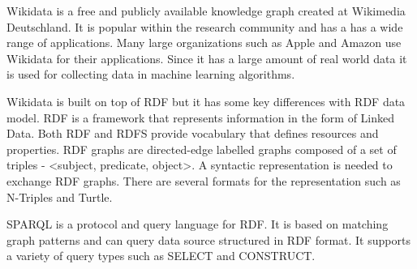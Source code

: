 \documentclass[12 pt, a4paper]{report}
\theoremstyle{definition}
\newcommand{\anas}[1]{\todo[color=red,inline]{#1}}
\begin{document}
Wikidata is a free and publicly available knowledge graph created at Wikimedia Deutschland. It is popular within the research community and has a has a wide range of applications. Many large organizations such as Apple and Amazon use Wikidata for their applications. Since it has a large amount of real world data it is used for collecting data in machine learning algorithms.

Wikidata is built on top of RDF but it has some key differences with RDF data model. RDF is a framework that represents information in the form of Linked Data. Both RDF and RDFS provide vocabulary that defines resources and properties. RDF graphs are directed-edge labelled graphs composed of a set of triples - <subject, predicate, object>. A syntactic representation is needed to exchange RDF graphs. There are several formats for the representation such as N-Triples and Turtle.

SPARQL is a protocol and query language for RDF. It is based on matching graph patterns and can query data source structured in RDF format. It supports a variety of query types such as SELECT and CONSTRUCT. 


\anas{complete this}



\tableofcontents
\newpage
\listoffigures
\newpage
\listoftables
\newpage
\lstlistoflistings
\newpage
\pagebreak

{}



\pagebreak



\pagebreak



\pagebreak



\pagebreak



\pagebreak


\singlespacing




\end{document}
